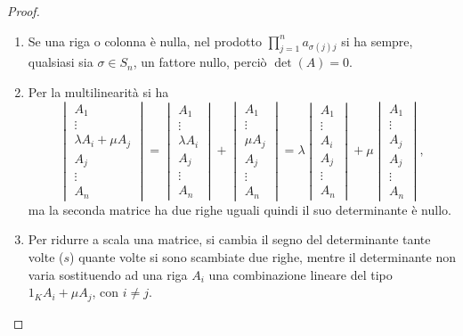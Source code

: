 \begin{proof}
	\begin{enumerate}
		\item Se una riga o colonna è nulla, nel prodotto $\prod_{j=1}^na_{\sigma(j)j}$ si ha sempre, qualsiasi sia $\sigma\in S_n$, un fattore nullo, perciò $\det(A)=0$.
	\item Per la multilinearità si ha
		\begin{equation*}
			\begin{vmatrix}
				A_1\\\vdots\\\lambda A_i+\mu A_j\\ A_j\\\vdots\\A_n
			\end{vmatrix}
			=
			\begin{vmatrix}
				A_1\\\vdots\\\lambda A_i\\ A_j\\\vdots\\A_n
			\end{vmatrix}
			+
			\begin{vmatrix}
				A_1\\\vdots\\\mu A_j\\ A_j\\\vdots\\A_n
			\end{vmatrix}
			=\lambda
			\begin{vmatrix}
				A_1\\\vdots\\A_i\\ A_j\\\vdots\\A_n
			\end{vmatrix}
			+\mu
			\begin{vmatrix}
				A_1\\\vdots\\A_j\\ A_j\\\vdots\\A_n
			\end{vmatrix},
		\end{equation*}
		ma la seconda matrice ha due righe uguali quindi il suo determinante è nullo.
	\item Per ridurre a scala una matrice, si cambia il segno del determinante tante volte ($s$) quante volte si sono scambiate due righe, mentre il determinante non varia sostituendo ad una riga $A_i$ una combinazione lineare del tipo $1_KA_i+\mu A_j$, con $i\neq j$.

\end{enumerate}
\end{proof}
